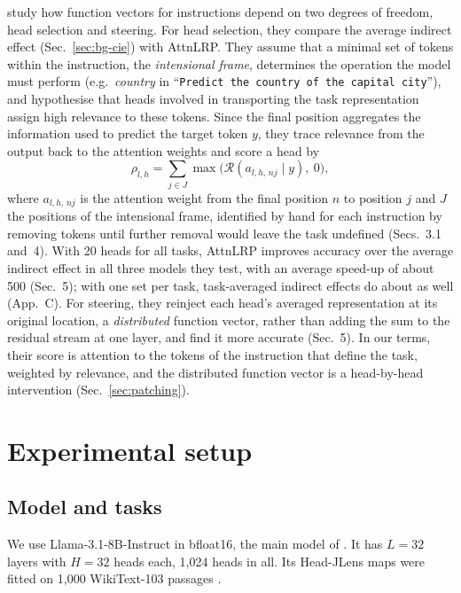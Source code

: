 \documentclass[10pt,a4paper]{article}
\newcommand{\p}[1]{``\texttt{#1}''}
\begin{document}
\citet{pham2026fast} study how function vectors for instructions depend on two degrees of freedom, head selection and steering. For head selection, they compare the average indirect effect (Sec.~\ref{sec:bg-cie}) with AttnLRP. They assume that a minimal set of tokens within the instruction, the \emph{intensional frame}, determines the operation the model must perform (e.g.\ \emph{country} in \p{Predict the country of the capital city}), and hypothesise that heads involved in transporting the task representation assign high relevance to these tokens. Since the final position aggregates the information used to predict the target token $y$, they trace relevance from the output back to the attention weights and score a head by
\begin{equation}
\rho_{l,h} = \sum_{j\in J} \max\big(\mathcal{R}(a_{l,h,\,nj} \mid y),\ 0\big),
\end{equation}
where $a_{l,h,\,nj}$ is the attention weight from the final position $n$ to position $j$ and $J$ the positions of the intensional frame, identified by hand for each instruction by removing tokens until further removal would leave the task undefined (Secs.~3.1 and~4). With 20 heads for all tasks, AttnLRP improves accuracy over the average indirect effect in all three models they test, with an average speed-up of about 500 (Sec.~5); with one set per task, task-averaged indirect effects do about as well (App.~C). For steering, they reinject each head's averaged representation at its original location, a \emph{distributed} function vector, rather than adding the sum to the residual stream at one layer, and find it more accurate (Sec.~5). In our terms, their score is attention to the tokens of the instruction that define the task, weighted by relevance, and the distributed function vector is a head-by-head intervention (Sec.~\ref{sec:patching}).

\section{Experimental setup}\label{sec:setup}

\subsection{Model and tasks}\label{sec:model}

We use Llama-3.1-8B-Instruct in bfloat16, the main model of \citet{yang2026shared}. It has $L=32$ layers with $H=32$ heads each, 1{,}024 heads in all. Its Head-JLens maps were fitted on 1{,}000 WikiText-103 passages \citep{merlo2026headjlens}.
\end{document}
